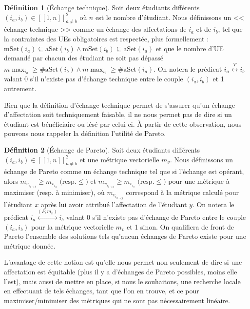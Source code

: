 \documentclass{rapport}
\theoremstyle{definition}
\newtheorem{definition}{Définition}
\theoremstyle{remark}
\theoremstyle{plain}
\theoremstyle{definition}
\theoremstyle{remark}
\begin{document}
\begin{definition}[Échange technique]
    Soit deux étudiants différents $\left(i_a,i_b\right)\in[\![1,n]\!]^2_{a\ne b}$ où $n$ est le nombre d'étudiant. 
    Nous définissons un << échange technique >> comme un échange des affectations de $i_a$ et de $i_b$, tel que la contraintes des UEs obligatoires est respectée, plus formellement : $\text{mSet}(i_a)\subseteq\text{aSet}(i_b) \land \text{mSet}(i_b)\subseteq\text{aSet}(i_a)$ 
    et que le nombre d'UE demandé par chacun des étudiant ne soit pas dépassé $m\!\max_{i_a}\ge\#\text{aSet}(i_b)\land m\!\max_{i_b}\ge\#\text{aSet}(i_a)$.
    On notera le prédicat $i_a\stackrel{T}{\longleftrightarrow} i_b$ valant 0 s'il n'existe pas d'échange technique entre le couple $(i_a, i_b)$ et 1 autrement.  
\end{definition}

Bien que la définition d'échange technique permet de s'assurer qu'un échange d'affectation soit techniquement faisable, il ne nous permet pas de dire si un étudiant est bénéficiaire ou lésé par celui-ci. 
À partir de cette observation, nous pouvons nous rappeler la définition l'utilité de Pareto.
\begin{definition}[Échange de Pareto]
    Soit deux étudiants différents $\left(i_a,i_b\right)\in[\![1,n]\!]^2_{a\ne b}$ et une métrique vectorielle $m_v$.
    Nous définissons un échange de Pareto comme un échange technique tel que si l'échange est opérant, alors $m_{v_{i_{a\to b}}} \ge m_{v_{i_a}}\text{ (resp.}\le\text{)}$ et $m_{v_{i_{b\to a}}} \ge m_{v_{i_b}}\text{ (resp.}\le\text{)}$ pour une métrique à maximiser (resp. à minimiser),
    où $m_{v_{i_{x\to y}}}$ correspond à la métrique calculé pour l'étudiant $x$ après lui avoir attribué l'affectation de l'étudiant $y$.
    On notera le prédicat $i_a\stackrel{(P,m_v)}{\longleftrightarrow} i_b$ valant 0 s'il n'existe pas d'échange de Pareto entre le couple $(i_a, i_b)$ pour la métrique vectorielle $m_v$ et 1 sinon.
    On qualifiera de front de Pareto l'ensemble des solutions tels qu'aucun échanges de Pareto existe pour une métrique donnée.
\end{definition}

L'avantage de cette notion est qu'elle nous permet non seulement de dire si une affectation est équitable (plus il y a d'échanges de Pareto possibles, moins elle l'est), 
mais aussi de mettre en place, si nous le souhaitons, une recherche locale en effectuant de tels échanges, tant que l'on en trouve, et ce pour maximiser/minimiser des métriques qui ne sont pas nécessairement linéaire.
\end{document}
